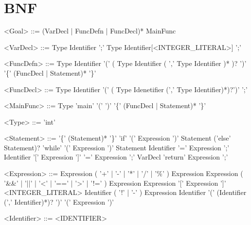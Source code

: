 \documentclass{ctexart}
\newenvironment{typewriterfont}{\ttfamily}{\par}
\begin{document}
\section{BNF}
\setlength{\grammarindent}{8em} %
\begin{typewriterfont}
\begin{grammar}
<Goal> ::= (VarDecl | FuncDefn | FuncDecl)* MainFunc

<VarDecl> ::= Type Identifier ';'
\alt Type Identifier[<INTEGER\_LITERAL>] ';'

<FuncDefn>  ::= Type Identifier '(' ( Type Identifier ( ',' Type Identifier )* )? ')' '\{' (FuncDecl | Statement)* '\}'

<FuncDecl> ::= Type Identifier '(' ( Type Idenetifier (',' Type Identifier)*)?')' ';'

<MainFunc> ::= Type 'main' '(' ')' '\{' (FuncDecl | Statement)* '\}'

<Type> ::= 'int'

<Statement> ::= '\{' (Statement)* '\}'
\alt 'if' '(' Expression ')' Statement ('else' Statement)?
\alt 'while' '(' Expression ')' Statement
\alt Identifier '=' Expression ';'
\alt Identifier '[' Expression ']' '=' Expression ';'
\alt VarDecl
\alt 'return' Expression ';'

<Expression>	::=	Expression ( '+' | '-' | '*' | '/' | '\%' ) Expression
\alt Expression ( '\&\&' | '||' | '\textless' | '==' | '\textgreater' | '!=' ) Expression
\alt Expression '[' Expression ']'
\alt <INTEGER\_LITERAL>
\alt Identifier
\alt ( '!' | '-' ) Expression
\alt Identifier '(' (Identifier (',' Identifier)*)? ')'
\alt '(' Expression ')'

<Identifier>	::=	<IDENTIFIER>

\end{grammar}
\end{typewriterfont}

\newpage
\end{document}
